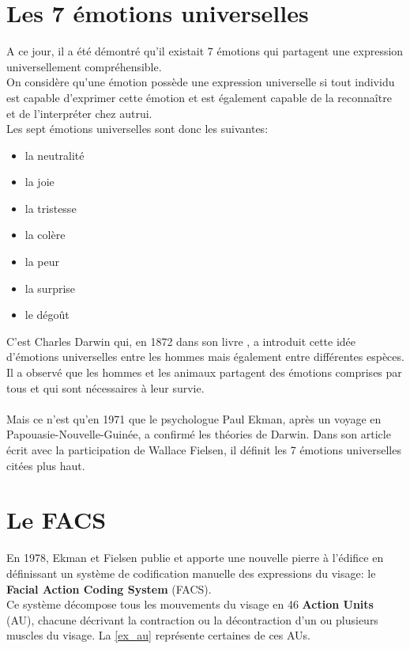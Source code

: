 \documentclass[poster]{polytech/polytech}
\begin{document}
\newpage
\section{Les 7 émotions universelles}
\label{sec:expr_uni}

A ce jour, il a été démontré qu'il existait 7 émotions qui partagent une expression universellement compréhensible.\\
On considère qu'une émotion possède une expression universelle si tout individu est capable d'exprimer cette émotion et est également capable de la reconnaître et de l'interpréter chez autrui.\\
Les sept émotions universelles sont donc les suivantes:
\begin{itemize}
	\item la neutralité
	\item la joie
	\item la tristesse
	\item la colère
	\item la peur
	\item la surprise
	\item le dégoût
\end{itemize}

C'est Charles Darwin qui, en 1872 dans son livre \cite{darwin}, a introduit cette idée d'émotions universelles entre les hommes mais également entre différentes espèces. Il a observé que les hommes et les animaux partagent des émotions comprises par tous et qui sont nécessaires à leur survie.\\
\\
Mais ce n'est qu'en 1971 que le psychologue Paul Ekman, après un voyage en Papouasie-Nouvelle-Guinée, a confirmé les théories de Darwin. Dans son article \cite{ekman} écrit avec la participation de Wallace Fielsen, il définit les 7 émotions universelles citées plus haut.\\

\section{Le FACS}
\label{sec:facs}

En 1978, Ekman et Fielsen publie \cite{ekman2} et apporte une nouvelle pierre à l'édifice en définissant un système de codification manuelle des expressions du visage: le \textbf{Facial Action Coding System} (FACS).\\
Ce système décompose tous les mouvements du visage en 46 \textbf{Action Units} (AU), chacune décrivant la contraction ou la décontraction d'un ou plusieurs muscles du visage. La \autoref{ex_au} représente certaines de ces AUs.\\
\end{document}
